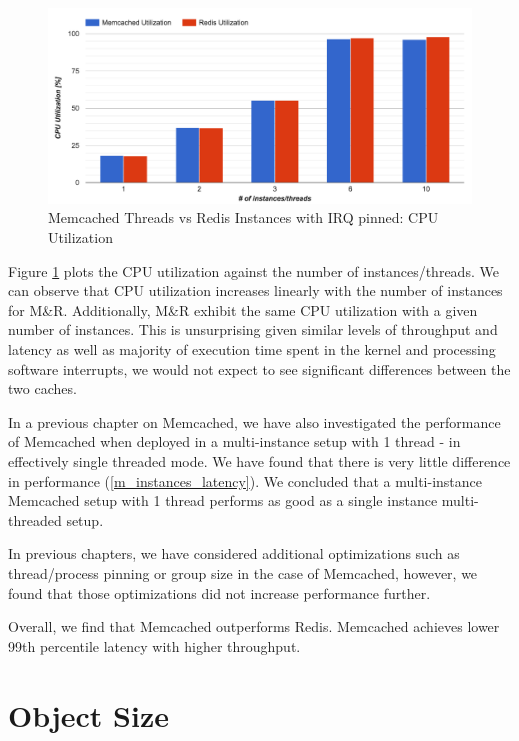 \begin{figure}[h]
    \includegraphics[width=\textwidth]{./res2/mr_irq_cpu.png}
    \caption{Memcached Threads vs Redis Instances with IRQ pinned: CPU Utilization}
    \label{fig:mr_irq_cpu}
\end{figure}

Figure \ref{fig:mr_irq_cpu} plots the CPU utilization against the number of instances/threads. We can observe that CPU utilization increases linearly with the number of instances for M\&R. Additionally, M\&R exhibit the same CPU utilization with a given number of instances. This is unsurprising given similar levels of throughput and latency as well as majority of execution time spent in the kernel and processing software interrupts, we would not expect to see significant differences between the two caches.

In a previous chapter on Memcached, we have also investigated the performance of Memcached when deployed in a multi-instance setup with 1 thread - in effectively single threaded mode. We have found that there is very little difference in performance (\ref{m_instances_latency}). We concluded that a multi-instance Memcached setup with 1 thread performs as good as a single instance multi-threaded setup.

In previous chapters, we have considered additional optimizations such as thread/process pinning or group size in the case of Memcached, however, we found that those optimizations did not increase performance further.

Overall, we find that Memcached outperforms Redis. Memcached achieves lower 99th percentile latency with higher throughput.

\section{Object Size}

